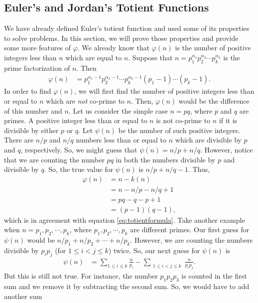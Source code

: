 \documentclass[12pt]{subfile}
\begin{document}
	\subsection{Euler's and Jordan's Totient Functions}
		We have already defined Euler's totient function and used some of its properties to solve problems. In this section, we will prove those properties and provide some more features of $\varphi$. We already know that $\varphi(n)$ is the number of positive integers less than $n$ which are equal to $n$. Suppose that $n= p_1^{\alpha_1} p_2^{\alpha_2} \cdots p_k^{\alpha_k}$ is the prime factorization of $n$. Then
			\begin{align}
				\varphi(n) & = p_1^{\alpha_1-1} p_2^{\alpha_2-1} \cdots p_k^{\alpha_k-1} \left( p_1 -1 \right) \cdots \left( p_k -1 \right). \label{eq:totientformula}
			\end{align}
		In order to find $\varphi(n)$, we will first find the number of positive integers less than or equal to $n$ which are \textit{not} co-prime to $n$. Then, $\varphi(n)$ would be the difference of this number and $n$. Let us consider the simple case $n=pq$, where $p$ and $q$ are primes. A positive integer less than or equal to $n$ is not co-prime to $n$ if it is divisible by either $p$ or $q$. Let $\psi(n)$ be the number of such positive integers. There are $n/p$ and $n/q$ numbers less than or equal to $n$ which are divisible by $p$ and $q$, respectively. So, we might guess that $\psi(n)=n/p+n/q$. However, notice that we are counting the number $pq$ in both the numbers divisible by $p$ and divisible by $q$. So, the true value for $\psi(n)$ is $n/p+n/q-1$. Thus,
			\begin{align*}
				\varphi(n) &= n - k(n)\\
				&= n - n/p - n/q + 1\\
				&= pq - q - p +1\\
				&= (p-1)(q-1),
			\end{align*}
		which is in agreement with equation \ref{eq:totientformula}. Take another example when $n=p_1,p_2,\cdots,p_k$, where $p_1,p_2,\cdots,p_k$ are different primes. Our first guess for $\psi(n)$ would be $n/p_1 +‌n/p_2 + \cdots + n/p_k$. However, we are counting the numbers divisible by $p_ip_j$ (for $1\leq i <j \leq k$) twice. So, our next guess for $\psi(n)$ is
			\begin{align*}
				\psi(n) &= \sum_{1 \leq i \leq k} \frac{n}{p_i} - \sum_{\substack{1 \leq i < j\leq k }} \frac{n}{p_ip_j}.
			\end{align*}
		But this is still not true. For instance, the number $p_1p_2p_3$ is counted in the first sum and we remove it by subtracting the second sum. So, we would have to add another sum
\end{document}

